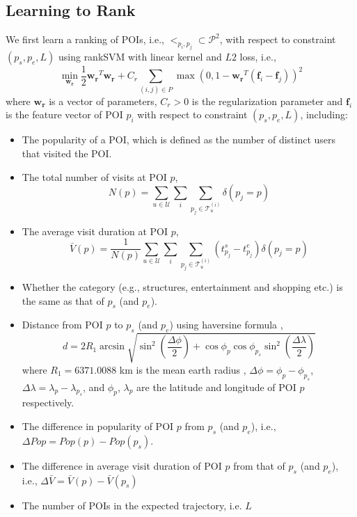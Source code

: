 \subsection{Learning to Rank}
\label{method:ranking}
We first learn a ranking of POIs, i.e., $<_{p_i, p_j} \subset \mathcal{P}^2$,
with respect to constraint $(p_s, p_e, L)$
using rankSVM with linear kernel and $L2$ loss\cite{lranksvm},
i.e.,
\begin{displaymath}
\min_{\mathbf{w_r}} \frac{1}{2} \mathbf{w_r}^T \mathbf{w_r} +
                  C_r \sum_{(i, j) \in P} \max \left( 0, 1 - \mathbf{w_r}^T (\mathbf{f}_i - \mathbf{f}_j) \right)^2
\end{displaymath}
where $\mathbf{w_r}$ is a vector of parameters,
$C_r > 0$ is the regularization parameter and
$\mathbf{f}_i$ is the feature vector of POI $p_i$ with respect to constraint $(p_s, p_e, L)$,
including:
\begin{itemize}
\item The popularity of a POI, which is defined as the number of distinct users that visited the POI\cite{ht10}.
\item The total number of visits at POI $p$,
      \begin{displaymath}
          N(p) = \sum_{u \in \mathcal{U}} \sum_i \sum_{p_j \in \mathcal{T}_u^{(i)}} \delta(p_j = p)
      \end{displaymath}
\item The average visit duration at POI $p$\cite{ijcai15},
      \begin{displaymath}
          \bar{V}(p) = \frac{1}{N(p)} \sum_{u \in \mathcal{U}} \sum_i \sum_{p_j \in \mathcal{T}_u^{(i)}} (t_{p_j}^s - t_{p_j}^e) \delta(p_j = p)
      \end{displaymath}
\item Whether the category (e.g., structures, entertainment and shopping etc.) is the same as that of $p_s$ (and $p_e$).
\item Distance from POI $p$ to $p_s$ (and $p_e$) using haversine formula \cite{haversine},
      \begin{displaymath}
      d = 2 R_1 \arcsin \sqrt{ \sin^2 \left( \frac{\Delta \phi}{2} \right) +
           \cos \phi_p \cos \phi_{p_s} \sin^2 \left( \frac{\Delta \lambda}{2} \right) }
      \end{displaymath}
            where $R_1 = 6371.0088$ km is the mean earth radius \cite{earth_radius},
            $\Delta \phi = \phi_p - \phi_{p_s}$, $\Delta \lambda = \lambda_p - \lambda_{p_s}$,
            and $\phi_p$, $\lambda_p$ are the latitude and longitude of POI $p$ respectively.
\item The difference in popularity of POI $p$ from $p_s$ (and $p_e$),
      i.e., $\Delta Pop = Pop(p) - Pop(p_s)$.
\item The difference in average visit duration of POI $p$ from that of $p_s$ (and $p_e$),
      i.e., $\Delta \bar{V} = \bar{V}(p) - \bar{V}(p_s)$
\item The number of POIs in the expected trajectory, i.e. $L$
\end{itemize}

